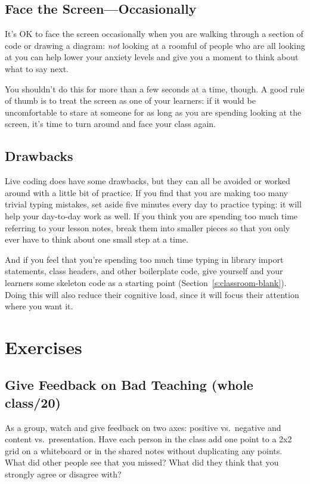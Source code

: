 \subsection*{Face the Screen---Occasionally}

It's OK to face the screen occasionally
when you are walking through a section of code or drawing a diagram:
\emph{not} looking at a roomful of people who are all looking at you
can help lower your anxiety levels and give you a moment to think about what to say next.

You shouldn't do this for more than a few seconds at a time, though.
A good rule of thumb is to treat the screen as one of your learners:
if it would be uncomfortable to stare at someone
for as long as you are spending looking at the screen,
it's time to turn around and face your class again.

\subsection*{Drawbacks}

Live coding does have some drawbacks,
but they can all be avoided or worked around with a little bit of practice.
If you find that you are making too many trivial typing mistakes,
set aside five minutes every day to practice typing:
it will help your day-to-day work as well.
If you think you are spending too much time referring to your lesson notes,
break them into smaller pieces
so that you only ever have to think about one small step at a time.

And if you feel that you're spending too much time typing in library import statements,
class headers,
and other boilerplate code,
give yourself and your learners some skeleton code as a starting point (Section~\ref{s:classroom-blank}).
Doing this will also reduce their cognitive load,
since it will focus their attention where you want it.

\section{Exercises}\label{s:performance-exercises}

\subsection*{Give Feedback on Bad Teaching (whole class/20)}

As a group,
watch 
and give feedback on two axes:
positive vs.\ negative and content vs.\ presentation.
Have each person in the class add one point to a 2x2 grid on a whiteboard or in the shared notes
without duplicating any points.
What did other people see that you missed?
What did they think that you strongly agree or disagree with?

